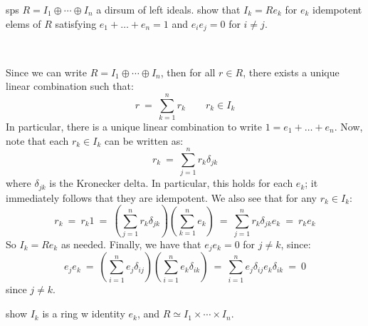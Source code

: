\nq
\begin{exr}[title=Exercise 1.7 part a)]
	sps $R=I_{1}\oplus\cdots\oplus I_{n}$ a dirsum of left ideals.
	show that $I_{k}=Re_{k}$ for $e_{k}$ idempotent elems of $R$ satisfying
	$e_{1}+ \dots + e_{n}=1$ and $e_{i}e_{j}=0$ for $i\neq j$.
\end{exr} \

\begin{pf}
	Since we can write $R=I_{1}\oplus \cdots \oplus I_{n}$, then for all
	$r\in R$, there exists a unique linear combination such that:
	\begin{equation*}
	    r \ = \ \sum_{k=1}^{n}r_{k} \qquad r_{k}\in I_{k}
	\end{equation*}
	In particular, there is a unique linear combination to write
	$1=e_{1}+\dots +e_{n}$.
	Now, note that each $r_{k}\in I_{k}$ can be written as:
	\begin{equation*}
	    r_{k} \ = \ \sum_{j=1}^{n}r_{k}\delta_{jk}
	\end{equation*}
	where $\delta_{jk}$ is the Kronecker delta.
	In particular, this holds for each $e_{k}$; it immediately follows that
	they are idempotent.
	We also see that for any $r_{k}\in I_{k}$:
	\begin{equation*}
	    r_{k} \ = \ r_{k}1 \ = \
		\left(\sum_{j=1}^{n}r_{k}\delta_{jk}\right)
		\left(\sum_{k=1}^{n}e_{k}\right)
		\ = \ \sum_{j=1}^{n}r_{k}\delta_{jk}e_{k}
		\ = \ r_{k}e_{k}
	\end{equation*}
	So $I_{k}=Re_{k}$ as needed.
	Finally, we have that $e_{j}e_{k}=0$ for $j\neq k$, since:
	\begin{equation*}
		e_{j}e_{k} \ = \
		\left(\sum_{i=1}^{n}e_{j}\delta_{ij}\right)
		\left(\sum_{i=1}^{n}e_{k}\delta_{ik}\right) \ = \
		\sum_{i=1}^{n}e_{j}\delta_{ij}e_{k}\delta_{ik} \ = \ 0
	\end{equation*}
	since $j\neq k$.
\end{pf}

\newpage
\begin{exr}[title=Exercise 1.7 part b)]
    show $I_{k}$ is a ring w identity $e_{k}$,
	and $R\simeq I_{1}\times \cdots \times I_{n}$.
\end{exr} \

